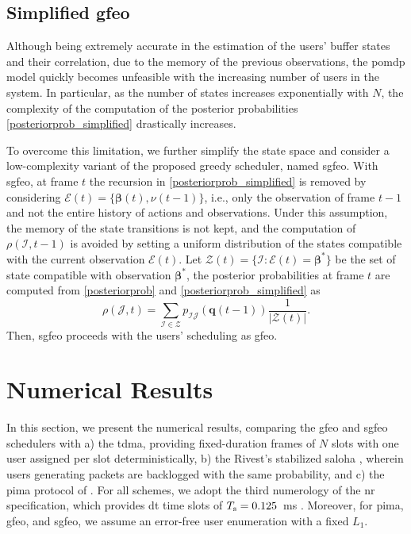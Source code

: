 \documentclass[conference]{IEEEtran}
\begin{document}
\subsection{Simplified \ac{gfeo}}
Although being extremely accurate in the estimation of the users' buffer states and their correlation, due to the memory of the previous observations, the \ac{pomdp} model quickly becomes unfeasible with the increasing number of users in the system. In particular, as the number of states increases exponentially with $N$, the complexity of the computation of the posterior probabilities \eqref{posteriorprob_simplified} drastically increases. 


To overcome this limitation, we further simplify the state space and consider a low-complexity variant of the proposed greedy scheduler, named \ac{sgfeo}.
With \ac{sgfeo}, at frame $t$ the recursion in \eqref{posteriorprob_simplified} is removed by considering $\mathcal{E}(t) = \{\bm{\beta}(t), \nu(t-1)\}$, i.e., only the observation of frame $t-1$ and not the entire history of actions and observations.
Under this assumption, the memory of the state transitions is not kept, and the computation of $\rho(\bm{\mathcal{I}}, t-1)$ is avoided by setting a uniform distribution of the states compatible with the current observation $\mathcal{E}(t)$.
Let $\mathcal{Z}(t) = \{\bm{\mathcal{I}}: \mathcal{E}(t) = \bm{\beta}^*\}$ be the set of state compatible with observation $\bm{\beta}^*$, the posterior probabilities at frame $t$ are computed from \eqref{posteriorprob} and \eqref{posteriorprob_simplified} as 
\begin{equation}\label{posteriorprob_sgfeo}
\rho(\bm{\mathcal{J}}, t) = \sum_{\bm{\mathcal{I}} \in \mathcal{Z}} p_{\bm{\mathcal{I}}\bm{\mathcal{J}}}(\bm{q}(t-1))\frac{1}{|\mathcal{Z}(t)|}.
\end{equation}
Then, \ac{sgfeo} proceeds with the users' scheduling as \ac{gfeo}.

\section{Numerical Results}\label{sec:numericalresults}
In this section, we present the numerical results, comparing the \ac{gfeo} and \ac{sgfeo} schedulers with a) the \ac{tdma}, providing fixed-duration frames of $N$ slots with one user assigned per slot deterministically, b) the Rivest's stabilized \ac{saloha} \cite{Rivest87Network}, wherein users generating packets are backlogged with the same probability, and c) the \ac{pima} protocol of \cite{rech2023partial}.
For all schemes, we adopt the third numerology of the \ac{nr} specification, which provides \ac{dt} time slots of $T_{\rm s} = 0.125$~ms \cite{3GPP38211}. Moreover, for \ac{pima}, \ac{gfeo}, and \ac{sgfeo}, we assume an error-free user enumeration with a fixed $L_1$. 
\end{document}
